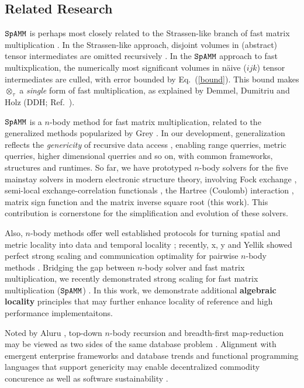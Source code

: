 \documentclass[letterpaper,twocolumn,amsmath,amsfont,amssymb,english,aps,jcp,preprintnumbers,groupaddress,nofootinbib,tightenlines,floatfix]{revtex4}
\newcommand{\ot}{  {\scriptstyle \otimes}_{ \tau } }
\theoremstyle{plain}
\theoremstyle{remark}
\theoremstyle{plain}
\begin{document}
\subsection{Related Research} 

$\tt SpAMM$ is perhaps most closely related to the Strassen-like branch of fast matrix multiplication 
\cite{springerlink:10.1007/BF02165411,Ballard2014}.
In the Strassen-like approach, disjoint volumes in (abstract) tensor intermediates are omitted recursively \cite{}.  
In the $\tt SpAMM$ approach to fast multixplication, the numerically most significant volumes in 
 n\"{a}ive ($ijk$) tensor intermediates are culled, with error bounded by Eq.~(\ref{bound}).  
This bound makes $\ot$ a {\em single} form of fast multiplication,  as explained by Demmel, Dumitriu and Holz (DDH; Ref.~\cite{Demmel07}).

$\tt SpAMM$ is a $n$-body method for fast matrix multiplication, related to the 
generalized methods popularized by Grey \cite{Gray2001,Gray2003}. In our development,
generalization reflects the {\em genericity} \cite{} of recursive data access \cite{}, 
enabling range querries, metric querries, higher dimensional querries and so on, with common frameworks, 
structures and runtimes.  So far, we have prototyped $n$-body solvers for the five mainstay solvers in modern electronic structure theory, 
involving Fock exchange \cite{}, semi-local exchange-correlation functionals \cite{}, 
the Hartree (Coulomb) interaction \cite{}, matrix sign function \cite{} and the matrix inverse square root (this work).
This contribution is cornerstone for the simplification and evolution of these solvers.  

Also, $n$-body methods offer well established protocols for turning spatial and metric locality into 
data and temporal locality \cite{}; recently, x, y  and Yellik showed perfect strong scaling and communication optimality 
for pairwise $n$-body methods \cite{Yellik}.   Bridging the gap between 
$n$-body solver and fast matrix multiplication, we recently demonstrated strong scaling for fast matrix multiplication ($\tt SpAMM$) \cite{}.  
In this work, we demonstrate additional {\bf algebraic locality} principles that may further enhance locality of reference and 
high performance implementaitons. 

Noted by Aluru \cite{}, top-down $n$-body recursion and breadth-first map-reduction may be viewed as two sides of 
the same database problem \cite{}.  Alignment with emergent enterprise frameworks and database trends \cite{} and 
functional programming languages that support genericity \cite{} may enable
decentralized commodity concurence \cite{} as well as software sustainability \cite{softwaresustainanbilty}.
\end{document}
